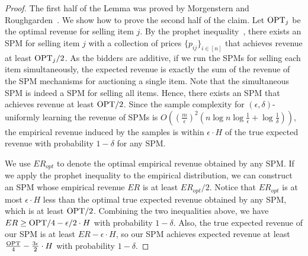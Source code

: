 \begin{proof}
The first half of the Lemma was proved by Morgenstern and Roughgarden~\cite{MorgensternR16}.
 We show how to prove the second half of the claim.
Let $\text{OPT}_j$ be the optimal revenue for selling item $j$.
 By the prophet inequality~\cite{Samuel-cahn84}, there exists an SPM for selling item $j$ with a collection of prices $\{p_{ij}\}_{i\in[n]}$ that achieves revenue at least $\text{OPT}_j/2$.
  As the bidders are additive, if we run the SPMs for selling each item simultaneously, the expected revenue is exactly the sum of the revenue of the SPM mechanisms for auctioning a single item.
   Note that the simultaneous SPM is indeed a SPM for selling all items. %
   Hence, there exists an SPM that achieves revenue at least $\text{OPT}/2$.
    Since the sample complexity for $(\epsilon,\delta)$-uniformly learning the revenue of SPMs is $O\left(\left(\frac{m}{\epsilon}\right)^2 \left(n\log n\log \frac{1}{\epsilon} + \log \frac{1}{\delta}\right)\right)$, the empirical revenue induced by the samples is within $\epsilon\cdot H$ of the true expected revenue with probability $1-\delta$ for any SPM. 

We use $ER_{opt}$ to denote the optimal empirical revenue obtained by any SPM.
 If we apply the prophet inequality to the empirical distribution, we can construct an SPM whose empirical revenue $ER$ is at least $ER_{opt}/2$. Notice that $ER_{opt}$ is at most $\epsilon\cdot H$ less than the optimal true expected revenue obtained by any SPM, which is at least $\text{OPT}/2$. Combining the two inequalities above, we have $ER\geq \text{OPT}/4-\epsilon/2\cdot H$ with probability $1-\delta$. Also, the true expected revenue of our SPM is at least $ER-\epsilon\cdot H$, so our SPM achieves expected revenue at least $\frac{\text{OPT}}{4}-\frac{3\epsilon}{2}\cdot H$ with probability  $1-\delta$. \end{proof}

